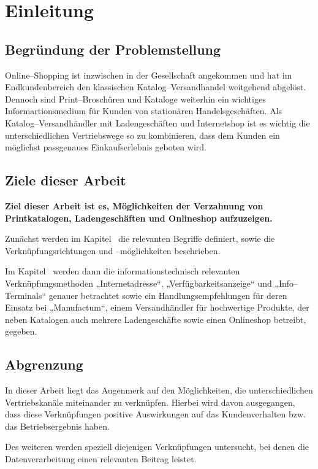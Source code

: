 \section{Einleitung}
\label{sec:einleitung}

\subsection{Begründung der Problemstellung}

Online--Shopping ist inzwischen in der Gesellschaft angekommen und hat im Endkundenbereich den klassischen Katalog--Versandhandel weitgehend abgelöst. Dennoch sind Print--Broschüren und Kataloge weiterhin ein wichtiges Informartionsmedium für Kunden von stationären Handelsgeschäften. Als Katalog--Versand\-händler mit Ladengeschäften und Internetshop ist es wichtig die unterschiedlichen Vertriebswege so zu kombinieren, dass dem Kunden ein möglichst passgenaues Einkaufserlebnis geboten wird.

\subsection{Ziele dieser Arbeit}

\textbf{Ziel dieser Arbeit ist es, Möglichkeiten der Verzahnung von Printkatalogen, Ladengeschäften und Onlineshop aufzuzeigen.}

Zunächst werden im Kapitel~ die relevanten Begriffe definiert, sowie die Verknüpfungsrichtungen und --möglichkeiten beschrieben.

Im Kapitel~ werden dann die informationstechnisch relevanten Verknüpfungsmethoden „Internetadresse“, „Verfügbarkeitsanzeige“ und „Info--Ter\-mi\-nals“ genauer betrachtet sowie ein Handlungsempfehlungen für deren Einsatz bei „Manufactum“, einem Versandhändler für hochwertige Produkte, der neben Katalogen auch mehrere Ladengeschäfte sowie einen Onlineshop betreibt, gegeben.

\subsection{Abgrenzung}

In dieser Arbeit liegt das Augenmerk auf den Möglichkeiten, die unterschiedlichen Vertriebskanäle miteinander zu verknüpfen. Hierbei wird davon ausgegangen, dass diese Verknüpfungen positive Auswirkungen auf das Kundenverhalten bzw. das Betriebsergebnis haben. 

Des weiteren werden speziell diejenigen Verknüpfungen untersucht, bei denen die Datenverarbeitung einen relevanten Beitrag leistet.

